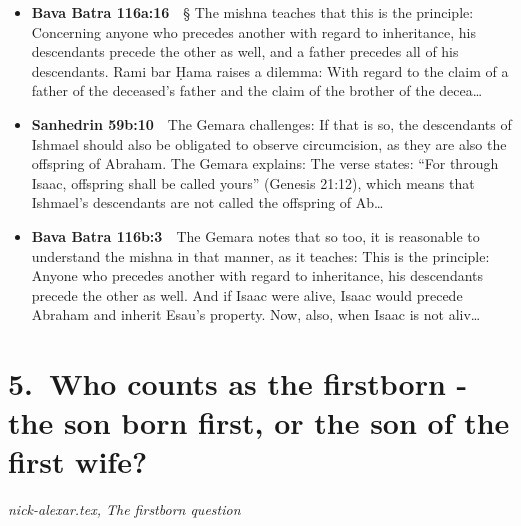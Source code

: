 \documentclass[11pt,a4paper]{article}
\begin{document}
\begin{itemize}[leftmargin=1.2em,itemsep=3pt]
\item {\color{ref}\textbf{Bava Batra 116a:16}}\ \ § The mishna teaches that this is the principle: Concerning anyone who precedes another with regard to inheritance, his descendants precede the other as well, and a father precedes all of his descendants. Rami bar Ḥama raises a dilemma: With regard to the claim of a father of the deceased’s father and the claim of the brother of the decea\ldots
\item {\color{ref}\textbf{Sanhedrin 59b:10}}\ \ The Gemara challenges: If that is so, the descendants of Ishmael should also be obligated to observe circumcision, as they are also the offspring of Abraham. The Gemara explains: The verse states: “For through Isaac, offspring shall be called yours” (Genesis 21:12), which means that Ishmael’s descendants are not called the offspring of Ab\ldots
\item {\color{ref}\textbf{Bava Batra 116b:3}}\ \ The Gemara notes that so too, it is reasonable to understand the mishna in that manner, as it teaches: This is the principle: Anyone who precedes another with regard to inheritance, his descendants precede the other as well. And if Isaac were alive, Isaac would precede Abraham and inherit Esau’s property. Now, also, when Isaac is not aliv\ldots
\end{itemize}

\section*{5.\ Who counts as the firstborn - the son born first, or the son of the first wife?}
{\color{quiet}\small\textit{nick-alexar.tex, The firstborn question}}
\end{document}
